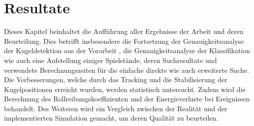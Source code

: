 \chapter{Resultate}\label{kap:resultate}
Dieses Kapitel beinhaltet die Aufführung aller Ergebnisse der Arbeit und deren Beurteilung.
Dies betrifft insbesondere die Fortsetzung der Genauigkeitsanalyse der Kugeldetektion aus der Vorarbeit \cite{project2:resultate},
die Genauigkeitsanalyse der Klassifikation wie auch eine Aufstellung einiger Spielstände,
deren Suchresultate und verwendete Berechnungszeiten für die einfache direkte wie auch erweiterte Suche.
Die Verbesserungen, welche durch das Tracking und die Stabilisierung der Kugelpositionen erreicht wurden, werden statistisch untersucht.
Zudem wird die Berechnung des Rollreibungskoeffizienten und der Energieverluste bei Ereignissen behandelt.
Des Weiteren wird ein Vergleich zwischen der Realität und der implementierten Simulation gemacht, um deren Qualität zu beurteilen.


\newpage



\newpage


\newpage

